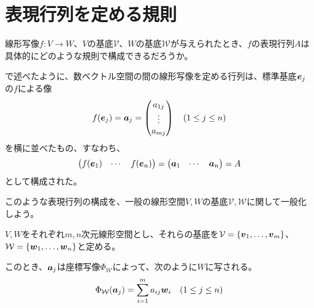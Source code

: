 \documentclass[../../../topic_linear-algebra]{subfiles}
\begin{document}
\sectionline
\section{表現行列を定める規則}\label{sec:construction-of-matrix-rep}

線形写像$f\colon V \to W$、$V$の基底$\mathcal{V}$、$W$の基底$\mathcal{W}$が与えられたとき、$f$の表現行列$A$は具体的にどのような規則で構成できるだろうか。

\br

で述べたように、数ベクトル空間の間の線形写像を定める行列は、標準基底$\vb*{e}_j$の$f$による像
\begin{equation*}
  f(\vb*{e}_j) = \vb*{a}_j = \begin{pmatrix}
    a_{1j} \\
    \vdots \\
    a_{mj}
  \end{pmatrix} \quad (1 \leq j \leq n)
\end{equation*}
を横に並べたもの、すなわち、
\begin{equation*}
  \begin{pmatrix}
    f(\vb*{e}_1) & \cdots & f(\vb*{e}_n)
  \end{pmatrix} = \begin{pmatrix}
    \vb*{a}_1 & \cdots & \vb*{a}_n
  \end{pmatrix} = A
\end{equation*}
として構成された。

\br

このような表現行列の構成を、一般の線形空間$V,W$の基底$\mathcal{V}, \mathcal{W}$に関して一般化しよう。

\br

$V, W$をそれぞれ$m,n$次元線形空間とし、それらの基底を$\mathcal{V} = \{ \vb*{v}_1, \ldots, \vb*{v}_m \}$、$\mathcal{W} = \{ \vb*{w}_1, \ldots, \vb*{w}_n \}$と定める。

\br

このとき、$\vb*{a}_j$は座標写像$\Phi_{\mathcal{W}}$によって、次のように$W$に写される。
\begin{equation*}
  \Phi_{\mathcal{W}}(\vb*{a}_j) = \sum_{i=1}^m a_{ij} \vb*{w}_i \quad (1 \leq j \leq n)
\end{equation*}
\end{document}
